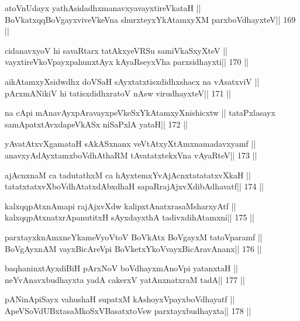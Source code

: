 \begin{shl}
atoV\s nUdayx yathAsidadhxmanavxyavayxtireVkataH ||
BoVkatxqqBoVgayxviveVkeVna shurxteyxYkAtamxyXM parxboVdhayxteV\hfill || 169 ||
\end{shl}

\begin{shl}
cidanavxyoV hi savaRtarx tatAkxyeVRSu samiVkaSxyXteV ||
vayxtireVkoV\s payxpahunxtAyx kAyaRseyxVha parxsidhayxti\hfill || 170 ||
\end{shl}

\begin{shl}
aikAtamxyXsidwdhx doVSaH sAyxtatxtisxdidhxshacx na vAsatxviV ||
pArxmANikiV hi tatisxdidhxratoV nAsw virudhayxteV\hfill || 171 ||
\end{shl}

\begin{shl}
na cApi mAnavAyxpAravayxpeVkeSxYkAtamxyXnishicxtw ||
tataPxlasayx samApatxtAvxdapeVkASx niSaPxlA yataH\hfill || 172 ||
\end{shl}

\begin{shl}
yAvatAtxvXgamataH sAkASxnanx veVtAtxyXtAmxnamadavxyamf ||
anavxyAdAyxtamxboVdhAthaRM tAvatatxtekxVna vAyaRteV\hfill || 173 ||
\end{shl}

\begin{shl}
ajAcnxnaM ca tadutathxM ca hAyxtemxYvAjAcnxtatatatxvXkaH ||
tatatxtatxvXboVdhAtatxdAbxdhaH sapaRrajAjxvXdibAdhavatf\hfill || 174 ||
\end{shl}

\begin{shl}
kalxqqpAtxnAmapi rajAjxvXdw kalipxtAnatxrasaMsharxyAtf ||
kalxqqpAtxnatxrApanutitxH sAyxdayxthA tadivxdihA\s\s tamxni\hfill || 175 ||
\end{shl}

\begin{shl}
parxtayxknAmxneYkameVyoV\s toV BoVkAtx BoVgayxM tatoV\s paramf ||
BoVgAyxnAM vayxBicAreV\s pi BoVketxYkoV\s vayxBicAravAnanx\hfill || 176 ||
\end{shl}

\begin{shl}
baqhaninxtAyxdiBiH pArxNoV boVdhayxmAnoV\s pi yatanxtaH ||
neYvAnavxbudhayxta yadA cakerxV yatAnxnatxraM tadA\hfill || 177 ||
\end{shl}

\begin{shl}
pANinA\s\s piSayx vahushaH supatxM kAshoyxV\s payxboVdhayatf ||
ApeVSoVdUBxtasaMkoSxVBasatxtoV\s sw parxtayxbudhayxta\hfill || 178 ||
\end{shl}

